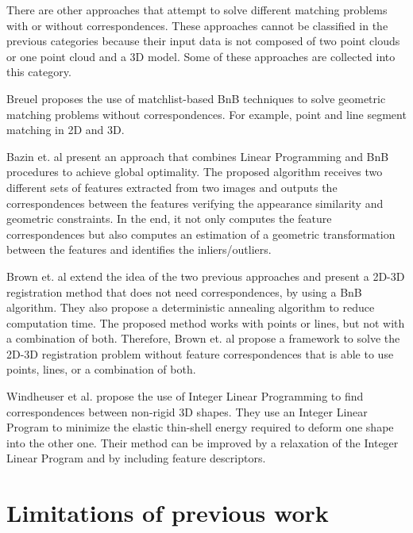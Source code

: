     There are other approaches that attempt to solve different matching problems with or without correspondences.
    These approaches cannot be classified in the previous categories because their input data is not composed of two point clouds or one point cloud and a 3D model.
    Some of these approaches are collected into this category.

    Breuel \cite{Breuel_2003_implementation} proposes the use of matchlist-based BnB techniques to solve geometric matching problems without correspondences.
    For example, point and line segment matching in 2D and 3D.

    Bazin et. al \cite{Bazin_2013_abranchandbound} present an approach that combines Linear Programming and BnB procedures to achieve global optimality.
    The proposed algorithm receives two different sets of features extracted from two images and outputs
    the correspondences between the features verifying the appearance similarity and geometric constraints.
    In the end, it not only computes the feature correspondences but also computes an estimation of a geometric transformation between the features
    and identifies the inliers/outliers.

    Brown et. al \cite{Brown_2015_globally} extend the idea of the two previous approaches and present a 2D-3D registration method that does not need
    correspondences, by using a BnB algorithm. They also propose a deterministic annealing algorithm to reduce computation time.
    The proposed method works with points or lines, but not with a combination of both.
    Therefore, Brown et. al \cite{Brown_2019_afamily} propose a framework to solve the 2D-3D registration problem without feature correspondences
    that is able to use points, lines, or a combination of both.

    Windheuser et al. \cite{Windheuser_2011_largescale} propose the use of Integer Linear Programming to find correspondences between non-rigid 3D shapes.
    They use an Integer Linear Program to minimize the elastic thin-shell energy required to deform one shape into the other one.
    Their method can be improved by a relaxation of the Integer Linear Program and by including feature descriptors.

    \section{Limitations of previous work} 

